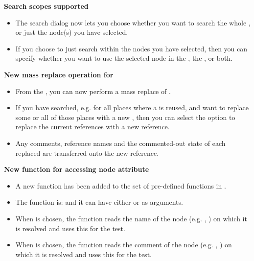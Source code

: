 \textbf{Search scopes supported}
\begin{itemize}
\item The search dialog now lets you choose whether you want to search the whole \gdproject{}, or just the node(s) you have selected. 
\item If you choose to just search within the nodes you have selected, then you can specify whether you want to use the selected node in the \gdtestsuitebrowser{}, the \gdtestcasebrowser{}, or both. 
\end{itemize}

\textbf{New mass replace operation for \gdcases{}}
\begin{itemize}
\item From the \gdsearchresultview{}, you can now perform a mass replace of \gdcases{}. 
\item If you have searched, e.g. for all places where a \gdcase{} is reused, and want to replace some or all of those places with a new \gdcase{}, then you can select the option to replace the current \gdcase{} references with a new \gdcase{} reference. 
\item Any comments, \gdcase{} reference names and the commented-out state of each replaced \gdcase{} are transferred onto the new \gdcase{} reference. 
\end{itemize}

\textbf{New function for accessing node attribute}
\begin{itemize}
\item A new function has been added to the set of pre-defined functions in \app{}.
\item The function is:  and it can have either  or  as arguments.
\item When  is chosen, the function reads the name of the node (e.g. \gdcase{}, \gdstep{}) on which it is resolved and uses this for the test.
\item  When  is chosen, the function reads the comment of the node (e.g. \gdcase{}, \gdstep{}) on which it is resolved and uses this for the test.
\end{itemize}

